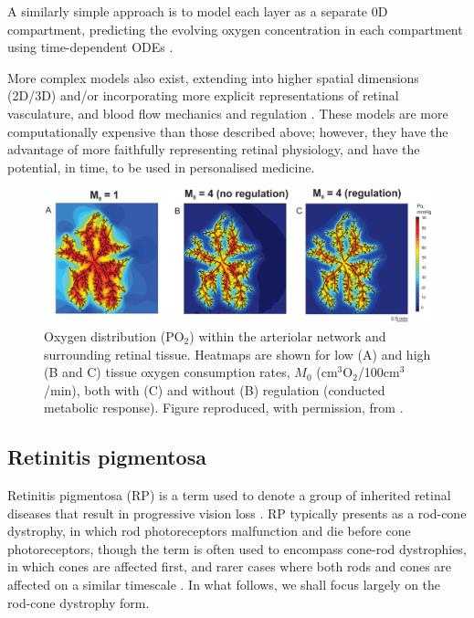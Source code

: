 \documentclass{article}
\begin{document}
A similarly simple approach is to model each layer as a separate 0D compartment, predicting the evolving oxygen concentration in each compartment using time-dependent ODEs \citep[see][who also model nitric oxide concentrations]{German_et_al_2021}.

More complex models also exist, extending into higher spatial dimensions (2D/3D) and/or incorporating more explicit representations of retinal vasculature, and blood flow mechanics and regulation \citep[see Figure \ref{Fig_Fry2020},][see also Section \ref{Sec_non-nAMD} for models relevant to non-nAMD]{Aquah_et_al_2021,Arciero_et_al_2021,Causin_2015,Friedland_1978,Fry_et_al_2018,Fry_et_al_2020,Linsenmeier_and_Zhang_2017,McDougall_et_al_2012,Watson_et_al_2012}. These models are more computationally expensive than those described above; however, they have the advantage of more faithfully representing retinal physiology, and have the potential, in time, to be used in personalised medicine.
%
\begin{figure}
\begin{center}
\includegraphics[scale=0.95]{Fry_et_al_2020_Fig_3_ABC}
\end{center}
\caption{Oxygen distribution (PO$_2$) within the arteriolar network and surrounding retinal tissue. Heatmaps are shown for low (A) and high (B and C) tissue oxygen consumption rates, $M_0$ (cm$^3$O$_2$/100cm$^3$/min), both with (C) and without (B) regulation (conducted metabolic response). Figure reproduced, with permission, from \citet{Fry_et_al_2020}.}
\label{Fig_Fry2020}
\end{figure}
%
%
\subsection{Retinitis pigmentosa}\label{Sec_RP}
%
Retinitis pigmentosa (RP) is a term used to denote a group of inherited retinal diseases that result in progressive vision loss \citep{Hamel_2006,Hartong_et_al_2006}. RP typically presents as a rod-cone dystrophy, in which rod photoreceptors malfunction and die before cone photoreceptors, though the term is often used to encompass cone-rod dystrophies, in which cones are affected first, and rarer cases where both rods and cones are affected on a similar timescale \citep{Hamel_2006,Hartong_et_al_2006}. In what follows, we shall focus largely on the rod-cone dystrophy form.
\end{document}
